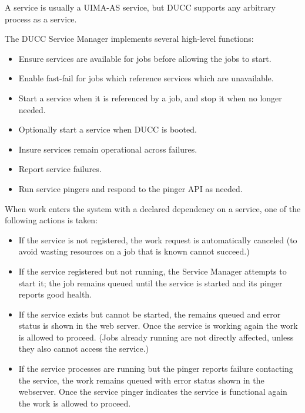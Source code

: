       A service is usually a UIMA-AS service, but DUCC supports any arbitrary process as a service.

      The DUCC Service Manager implements several high-level functions:
      
      \begin{itemize}
          \item Ensure services are available for jobs before allowing the jobs to start.
          \item Enable fast-fail for jobs which reference services which are unavailable.
          \item Start a service when it is referenced by a job, and stop it when no longer needed.
          \item Optionally start a service when DUCC is booted.
          \item Insure services remain operational across failures.
          \item Report service failures.
          \item Run service pingers and respond to the pinger API as needed.
       \end{itemize}

       When work enters the system with a declared dependency on a service, one of the following
       actions is taken:
       \begin{itemize}
          \item If the service is not registered, the work request is automatically canceled (to avoid
            wasting resources on a job that is known cannot succeed.)
          \item If the service registered but not running, the Service Manager attempts to start it; the job
           remains queued until the service is started and its pinger reports good health.
         \item If the service exists but cannot be started, the remains queued and error
             status is shown in the web server.  Once the service is working again the
             work is allowed to proceed.  (Jobs already running are not directly affected, unless they
             also cannot access the service.)
           \item If the service processes are running but the pinger reports failure contacting the service,
               the work remains queued with error status shown in the webserver.  Once the service
               pinger indicates the service is functional again the work is allowed to proceed.
       \end{itemize}
                
